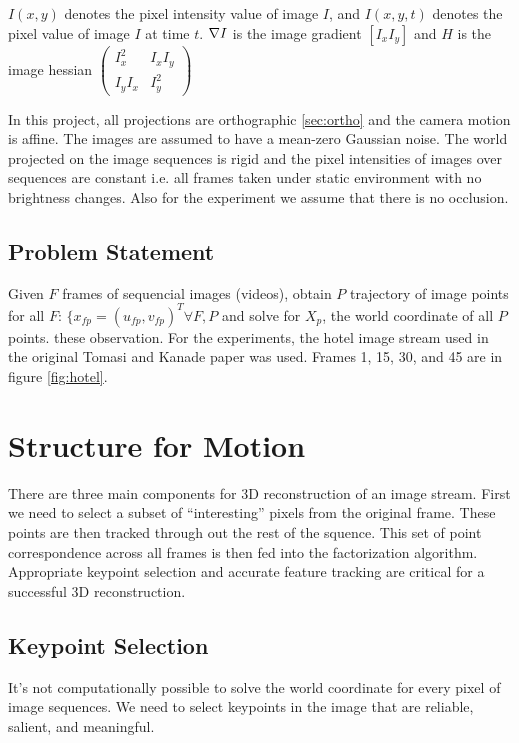 $I(x,y)$ denotes the pixel intensity value of image $I$, and $I(x,y,t)$ denotes the
pixel value of image $I$ at time $t$. $\nabla I$ is the image gradient
$[I_x  I_y]$ and $H$ is the image hessian $\begin{pmatrix}  I_x^2
  & I_xI_y \\ I_yI_x & I_y^2\end{pmatrix}$

In this project, all projections are orthographic \ref{sec:ortho}
and the camera motion is affine. The images are assumed to have a mean-zero Gaussian noise. The world projected on the image
sequences is rigid and the pixel intensities of images over sequences are
constant i.e. all frames taken under static environment with no
brightness changes. Also for the experiment we assume that there is
no occlusion.

\subsection{Problem Statement}
\label{sec:problem-statement}
Given $F$ frames of sequencial images (videos), obtain $P$ trajectory
of image points for all $F$: $\{x_{fp} = (u_{fp}, v_{fp})^T
\forall F, P$ and solve for $X_{p}$, the world coordinate of all $P$ points.
these observation. 
For the experiments, the hotel image stream used in the original
Tomasi and Kanade paper was used. Frames 1, 15, 30, and 45 are
in figure \ref{fig:hotel}. 
\section{Structure for Motion}
\label{sec:main}
There are three main components for 3D reconstruction of an image stream. First we need to select a subset of
``interesting'' pixels from the original frame. These points are then
tracked through out the rest of the squence. This set of point
correspondence across all frames is then fed into the factorization algorithm. Appropriate keypoint selection and accurate feature tracking
are critical for a successful 3D reconstruction. 

\subsection{Keypoint Selection}
\label{sec:keypoint-selection}
It's not computationally possible to solve the world coordinate for every pixel of image sequences. We need to
select keypoints in the image that are reliable, salient, and
meaningful. 

